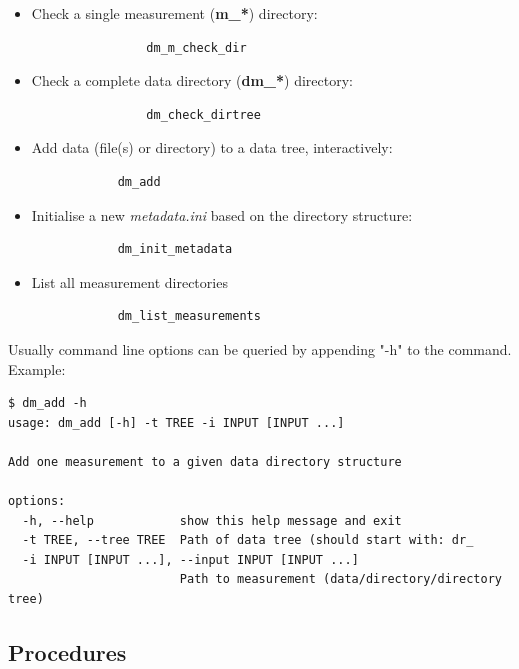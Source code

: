 \documentclass[fontsize=12]{scrartcl}
\begin{document}
\begin{itemize}
    \item Check a single measurement (\textbf{m\_*}) directory:
        \begin{verbatim}
                dm_m_check_dir
        \end{verbatim}
    \item Check a complete data directory (\textbf{dm\_*}) directory:
        \begin{verbatim}
                dm_check_dirtree
        \end{verbatim}
	\item Add data (file(s) or directory) to a data tree, interactively:
        \begin{verbatim}
            dm_add
        \end{verbatim}
    \item Initialise a new \textsl{metadata.ini} based on the directory structure:
        \begin{verbatim}
            dm_init_metadata
        \end{verbatim}
    \item List all measurement directories
        \begin{verbatim}
            dm_list_measurements
        \end{verbatim}
\end{itemize}

Usually command line options can be queried by appending "-h" to the command.
Example:
\begin{verbatim}
$ dm_add -h
usage: dm_add [-h] -t TREE -i INPUT [INPUT ...]

Add one measurement to a given data directory structure

options:
  -h, --help            show this help message and exit
  -t TREE, --tree TREE  Path of data tree (should start with: dr_
  -i INPUT [INPUT ...], --input INPUT [INPUT ...]
                        Path to measurement (data/directory/directory tree)
\end{verbatim}

\subsection{Procedures}
\end{document}

